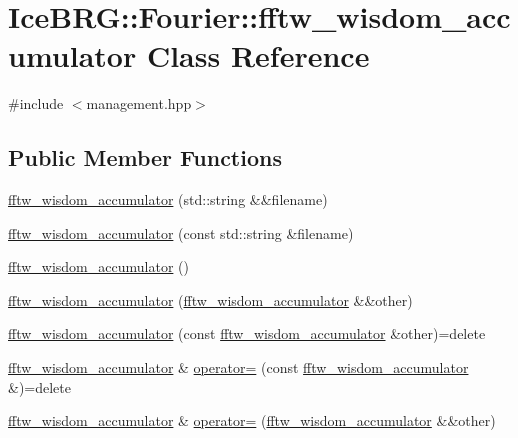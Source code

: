 \hypertarget{classIceBRG_1_1Fourier_1_1fftw__wisdom__accumulator}{}\section{Ice\+B\+R\+G\+:\+:Fourier\+:\+:fftw\+\_\+wisdom\+\_\+accumulator Class Reference}
\label{classIceBRG_1_1Fourier_1_1fftw__wisdom__accumulator}


{\ttfamily \#include $<$management.\+hpp$>$}

\subsection*{Public Member Functions}
\begin{DoxyCompactItemize}
\item 
\hyperlink{classIceBRG_1_1Fourier_1_1fftw__wisdom__accumulator_a2f3a1919baa2c613f9786b7e3ace4311}{fftw\+\_\+wisdom\+\_\+accumulator} (std\+::string \&\&filename)
\item 
\hyperlink{classIceBRG_1_1Fourier_1_1fftw__wisdom__accumulator_a449dd247cce3ecda28ba58461093a158}{fftw\+\_\+wisdom\+\_\+accumulator} (const std\+::string \&filename)
\item 
\hyperlink{classIceBRG_1_1Fourier_1_1fftw__wisdom__accumulator_a0c574284491de2442457c97b023262ef}{fftw\+\_\+wisdom\+\_\+accumulator} ()
\item 
\hyperlink{classIceBRG_1_1Fourier_1_1fftw__wisdom__accumulator_af314a39125c3e7a661f476e72f32737c}{fftw\+\_\+wisdom\+\_\+accumulator} (\hyperlink{classIceBRG_1_1Fourier_1_1fftw__wisdom__accumulator}{fftw\+\_\+wisdom\+\_\+accumulator} \&\&other)
\item 
\hyperlink{classIceBRG_1_1Fourier_1_1fftw__wisdom__accumulator_a45e97903bf3d7f87ed0e87f8a9954126}{fftw\+\_\+wisdom\+\_\+accumulator} (const \hyperlink{classIceBRG_1_1Fourier_1_1fftw__wisdom__accumulator}{fftw\+\_\+wisdom\+\_\+accumulator} \&other)=delete
\item 
\hyperlink{classIceBRG_1_1Fourier_1_1fftw__wisdom__accumulator}{fftw\+\_\+wisdom\+\_\+accumulator} \& \hyperlink{classIceBRG_1_1Fourier_1_1fftw__wisdom__accumulator_aebeeccec2a3094e5423b01bbbbaa502f}{operator=} (const \hyperlink{classIceBRG_1_1Fourier_1_1fftw__wisdom__accumulator}{fftw\+\_\+wisdom\+\_\+accumulator} \&)=delete
\item 
\hyperlink{classIceBRG_1_1Fourier_1_1fftw__wisdom__accumulator}{fftw\+\_\+wisdom\+\_\+accumulator} \& \hyperlink{classIceBRG_1_1Fourier_1_1fftw__wisdom__accumulator_a87e71230dafa9031d316ac11bcdc7b5c}{operator=} (\hyperlink{classIceBRG_1_1Fourier_1_1fftw__wisdom__accumulator}{fftw\+\_\+wisdom\+\_\+accumulator} \&\&other)

\end{DoxyCompactItemize}
